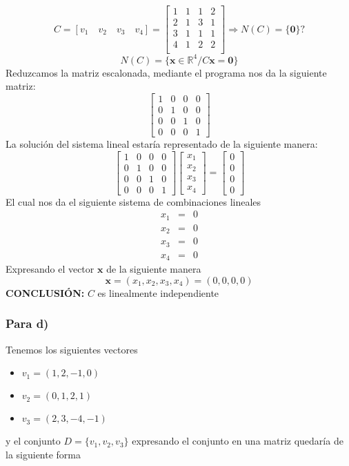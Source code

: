 \[
C = [ {v}_{1} \quad {v}_{2} \quad {v}_{3} \quad {v}_{4} ] =
\begin{bmatrix}
1 & 1 & 1 & 2 \\ 
2 & 1 & 3 & 1 \\
3 & 1 & 1 & 1 \\
4 & 1 & 2 & 2 \\
\end{bmatrix}
\Longrightarrow N(C) = \{ \mathbf{0} \} ?
\]
$$
N(C) = \{ \mathbf{x} \in \mathbb{R}^4 / C \mathbf{x} = \mathbf{0} \}
$$
Reduzcamos la matriz escalonada, mediante el programa nos da la siguiente matriz:
$$
\begin{bmatrix}
1 & 0 & 0 & 0 \\ 
0 & 1 & 0 & 0 \\
0 & 0 & 1 & 0 \\
0 & 0 & 0 & 1
\end{bmatrix}
$$
La solución del sistema lineal estaría representado de la siguiente manera:
\[
\begin{bmatrix}
1 & 0 & 0 & 0 \\ 
0 & 1 & 0 & 0 \\
0 & 0 & 1 & 0 \\
0 & 0 & 0 & 1
\end{bmatrix}
\begin{bmatrix}
{x}_{1} \\ 
{x}_{2} \\
{x}_{3} \\
{x}_{4}
\end{bmatrix} =
\begin{bmatrix}
0 \\ 
0 \\
0 \\
0
\end{bmatrix}
\]
El cual nos da el siguiente sistema de combinaciones lineales
\setcounter{equation}{0}
\begin{eqnarray}
    {x}_{1} &=& 0 \\
    {x}_{2} &=& 0 \\
    {x}_{3} &=& 0 \\
    {x}_{4} &=& 0
\end{eqnarray}
Expresando el vector $\mathbf{x}$ de la siguiente manera
$$
\mathbf{x} = ({x}_{1}, {x}_{2}, {x}_{3}, {x}_{4}) = (0, 0, 0, 0)
$$
\textbf{CONCLUSIÓN:} $C$ es linealmente independiente

\subsubsection{Para d)}
Tenemos los siguientes vectores
\begin{itemize}
    \item ${v}_{1} = (1,2,-1,0)$
    \item ${v}_{2} = (0,1,2,1)$
    \item ${v}_{3} = (2,3,-4,-1)$ 
\end{itemize}
y el conjunto $D=\{ {v}_{1}, {v}_{2}, {v}_{3} \}$ expresando el conjunto en una matriz quedaría de la siguiente forma

